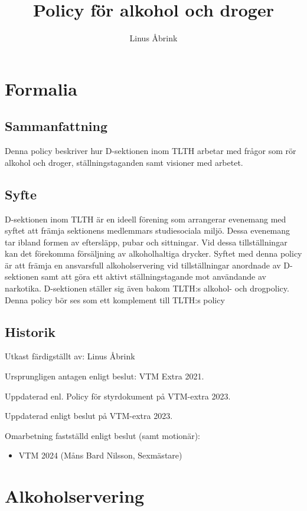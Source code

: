 \documentclass[]{dsekprotokoll}
\title{Policy för alkohol och droger}
\author{Linus Åbrink}
\begin{document}
\maketitle

\section{Formalia}

\subsection{Sammanfattning}
Denna policy beskriver hur D-sektionen inom TLTH arbetar med frågor
som rör alkohol och droger, ställningstaganden samt visioner med arbetet.

\subsection{Syfte}
D-sektionen inom TLTH är en ideell förening som arrangerar evenemang
med syftet att främja sektionens medlemmars studiesociala miljö.
Dessa evenemang tar ibland formen av eftersläpp, pubar och
sittningar. Vid dessa tillställningar kan det förekomma försäljning
av alkoholhaltiga drycker. Syftet med denna policy är att främja en
ansvarsfull alkoholservering vid tillställningar anordnade av
D-sektionen samt att göra ett aktivt ställningstagande mot användande
av narkotika. D-sektionen ställer sig även bakom TLTH:s alkohol- och
drogpolicy. Denna policy bör ses som ett komplement till TLTH:s policy

\subsection{Historik}
Utkast färdigställt av: Linus Åbrink

Ursprungligen antagen enligt beslut: VTM Extra 2021.

Uppdaterad enl. Policy för styrdokument på VTM-extra 2023.

Uppdaterad enligt beslut på VTM-extra 2023.

Omarbetning fastställd enligt beslut (samt motionär):
\begin{itemize}
  \item VTM 2024 (Måns Bard Nilsson, Sexmästare)
\end{itemize}

\section{Alkoholservering}
\end{document}
